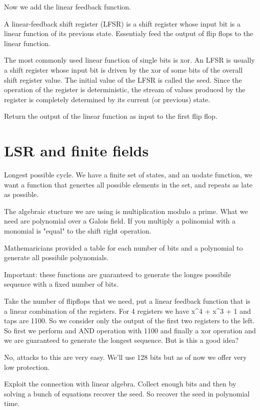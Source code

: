 Now we add the linear feedback function.

A linear-feedback shift register (LFSR) is a shift register whose input bit is a linear function of its previous state. Essentialy feed the output of flip flops to the linear function.

The most commonly used linear function of single
bits is xor. An LFSR is usually a shift register whose input bit is driven by the xor of some bits of the overall
shift register value. The initial value of the LFSR is called the seed. Since the operation of the register is deterministic, the stream of values produced by the register is completely determined by its current (or previous) state.

Return the output of the linear function as input to the first flip flop.


\section{LSR and finite fields}

Longest possible cycle.
We have a finite set of states, and an uodate function, we want a function that genertes all possible elements in the set, and repeats as late as possible.


The algebraic stucture we are using is multiplication modulo a prime.
What we need are polynomial over a Galois field.
If you multiply a polinomial with a monomial is "equal" to the shift right operation.

Mathemaricians provided a table for each number of bits and a polynomial to generate all possibile polynomials.

Important: these functions are guaranteed to generate the longes possibile sequence with a fixed number of bits.


Take the number of flipflops that we need, put a linear feedback function that is a linear combination of the registers. For 4 registers we have x^4 + x^3 + 1 and taps are 1100. So we consider only the output of the first two registers to the left. So first we perform and AND operation with 1100 and finally a xor operation and we are guaranteed to generate the longest sequence. But is this a good idea? 

No, attacks to this are very easy. We'll use 128 bits but as of now we offer very low protection.

Exploit the connection with linear algebra.
Collect enough bits and then by solving a bunch of equations recover the seed. So recover the seed in polynomial time.

